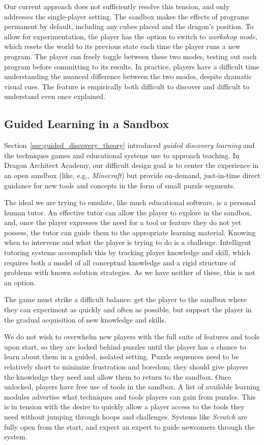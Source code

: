 \documentclass{sig-alternate}
\newcommand{\gametitle}{{\color{RoyalPurple} Dragon Architect Academy}}
\begin{document}
Our current approach does not sufficiently resolve this tension, and only addresses the single-player setting.
The sandbox makes the effects of programs permanent by default, including any cubes placed and the dragon's position.
To allow for experimentation, the player has the option to switch to \emph{workshop mode}, which resets the world to its previous state each time the player runs a new program. 
The player can freely toggle between these two modes, testing out each program before committing to its results. 
In practice, players have a difficult time understanding the nuanced difference between the two modes, despite dramatic visual cues.
The feature is empirically both difficult to discover and difficult to understand even once explained.

\subsection{Guided Learning in a Sandbox}
\label{sec:direct_guidance}

Section~\ref{sec:guided_discovery_theory} introduced \emph{guided discovery learning} and the techniques games and educational systems use to approach teaching.
In \gametitle{}, our difficult design goal is to center the experience in an open sandbox (like, e.g., \emph{Minecraft}) but provide on-demand, just-in-time direct guidance for new tools and concepts in the form of small puzzle segments.

The ideal we are trying to emulate, like much educational software, is a personal human tutor.
An effective tutor can allow the player to explore in the sandbox, and, once the player expresses the need for a tool or feature they do not yet possess, the tutor can guide them to the appropriate learning material.
Knowing when to intervene and what the player is trying to do is a challenge.
Intelligent tutoring systems accomplish this by tracking player knowledge and skill, which requires both a model of all conceptual knowledge and a rigid structure of problems with known solution strategies.
As we have neither of these, this is not an option.

The game must strike a difficult balance: get the player to the sandbox where they can experiment as quickly and often as possible, but support the player in the gradual acquisition of new knowledge and skills. 

We do not wish to overwhelm new players with the full suite of features and tools upon start, so they are locked behind puzzles until the player has a chance to learn about them in a guided, isolated setting.
Puzzle sequences need to be relatively short to minimize frustration and boredom; they should give players the knowledge they need and allow them to return to the sandbox.
Once unlocked, players have free use of tools in the sandbox.
A list of available learning modules advertise what techniques and tools players can gain from puzzles.
This is in tension with the desire to quickly allow a player access to the tools they need without jumping through hoops and challenges. 
Systems like \emph{Scratch} are fully open from the start, and expect an expert to guide newcomers through the system.
\end{document}
